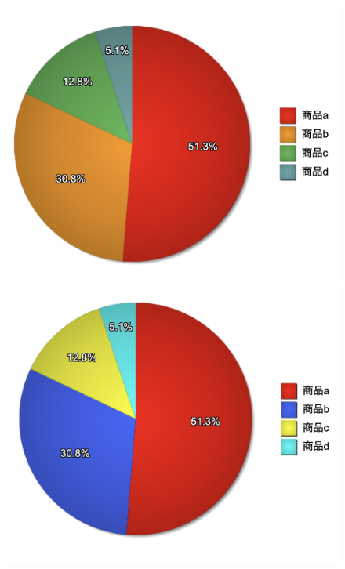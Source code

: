 \begin{figure}[H]
    \centering
    \begin{minipage}[b]{.49\columnwidth}
        \centering
        \includegraphics[keepaspectratio,width=\textwidth]{../../10_UniversalDesign/no2_circle_original.png}
    \end{minipage}
    \begin{minipage}[b]{.49\columnwidth}
        \centering
        \includegraphics[keepaspectratio,width=\textwidth]{../../10_UniversalDesign/no2_circle_reviced.png}

\end{minipage}
\end{figure}

